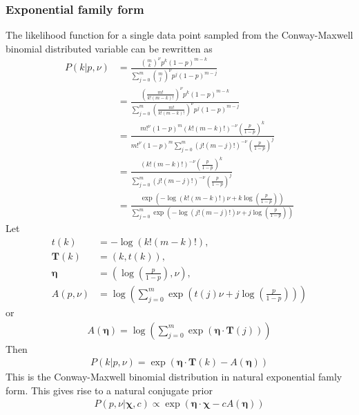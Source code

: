 \documentclass[a4paper,12pt]{article}
\theoremstyle{definition}
\begin{document}
\subsubsection{Exponential family form}
The likelihood function for a single data point sampled from the Conway-Maxwell binomial distributed variable can be rewritten as 
\begin{align}
  P(k | p, \nu) & = \frac{\binom{m}{k}^{\nu} p^{k} (1-p)^{m-k}}{\sum_{j=0}^m \binom{m}{j}^{\nu} p^j(1-p)^{m-j}} \\
  & = \frac{\left(\frac{m!}{k!(m-k)!}\right)^{\nu}p^{k} (1-p)^{m-k}}{\sum_{j=0}^m \left(\frac{m!}{k!(m-k)!}\right)^{\nu} p^j(1-p)^{m-j}} \\
  & = \frac{m!^{\nu} (1-p)^m (k!(m-k)!)^{-\nu} \left( \frac{p}{1-p}  \right)^k}{m!^{\nu} (1-p)^m \sum_{j=0}^m (j!(m-j)!)^{-\nu} \left( \frac{p}{1-p}  \right)^j } \\
  & = \frac{(k!(m-k)!)^{-\nu} \left( \frac{p}{1-p}  \right)^k}{\sum_{j=0}^m (j!(m-j)!)^{-\nu} \left( \frac{p}{1-p}  \right)^j} \\
  & = \frac{\exp \left(-\log(k!(m-k)!) \nu + k \log\left( \frac{p}{1-p}  \right) \right)}{\sum_{j=0}^m \exp \left( -\log(j!(m-j)!) \nu + j \log\left( \frac{p}{1-p}  \right) \right)}
\end{align}
Let 
\begin{align}
  t(k) &= -\log(k!(m-k)!), \\
  \mathbf{T}(k) &= (k, t(k)), \\ 
  \boldsymbol{\eta} &= \left( \log \left( \frac{p}{1-p} \right), \nu \right), \\
  A(p, \nu) &= \log \left( \sum_{j=0}^m \exp \left( t(j)\nu + j \log \left( \frac{p}{1-p} \right) \right) \right)
\end{align}
or 
\begin{align}
  A(\boldsymbol{\eta}) = \log \left( \sum_{j=0}^m \exp \left( \boldsymbol{\eta} \cdot \mathbf{T}(j) \right) \right)
\end{align}
Then 
\begin{align}
  P(k | p, \nu) = \exp \left( \boldsymbol{\eta} \cdot \mathbf{T}(k) - A(\boldsymbol{\eta}) \right)
\end{align}
This is the Conway-Maxwell binomial distribution in natural exponential famly form. This gives rise to a natural conjugate prior 
\begin{align}
  P(p, \nu | \boldsymbol{\chi}, c) \propto \exp \left( \boldsymbol{\eta \cdot \chi} - c A(\boldsymbol{\eta}) \right)
\end{align}
\end{document}
